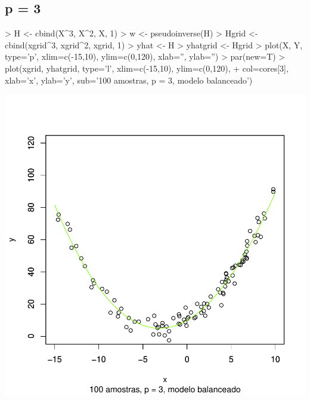 \documentclass{article}
\begin{document}
\subsection{p = 3}
\begin{Schunk}
\begin{Sinput}
> H <- cbind(X^3, X^2, X, 1)
> w <- pseudoinverse(H) %
> Hgrid <- cbind(xgrid^3, xgrid^2, xgrid, 1)
> yhat <- H %
> yhatgrid <- Hgrid %
> plot(X, Y, type='p', xlim=c(-15,10), ylim=c(0,120), xlab='', ylab='')
> par(new=T)
> plot(xgrid, yhatgrid, type='l', xlim=c(-15,10), ylim=c(0,120), 
+      col=cores[3], xlab='x', ylab='y', sub='100 amostras, p = 3, modelo balanceado')
\end{Sinput}
\end{Schunk}
\includegraphics{aprox-013}
\end{document}
